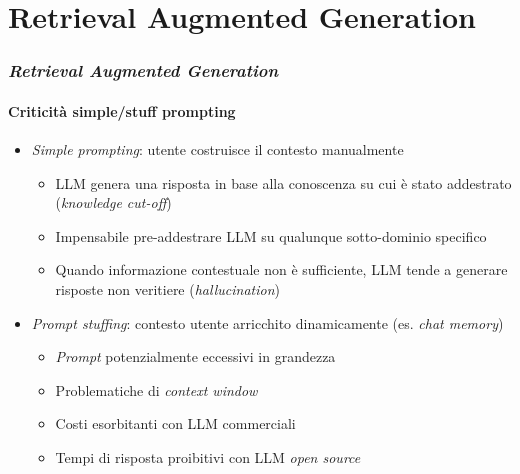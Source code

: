 \section{Retrieval Augmented Generation} %
\label{sec:rag}
%
\begin{frame}[t] \frametitle{\emph{Retrieval Augmented Generation}}
\framesubtitle{Criticità simple/stuff prompting}
{\footnotesize
{}
    \begin{minipage}[t]{\textwidth}
        \begin{itemize}[leftmargin=10pt,align=right]
            \item[\alert{\faArrowCircleRight}] \alert{\textit{Simple prompting}}: utente costruisce il contesto manualmente
            \begin{itemize}[leftmargin=10pt,align=right]
                \item[\alert{\faExclamationTriangle}] LLM genera una risposta in base alla conoscenza su cui è stato addestrato (\alert{\textit{knowledge cut-off}})
                \item[\alert{\faExclamationTriangle}] Impensabile pre-addestrare LLM su qualunque sotto-dominio specifico
                \item[\alert{\faExclamationTriangle}] Quando informazione contestuale non è sufficiente, LLM tende a generare risposte non veritiere (\alert{\textit{hallucination}})
            \end{itemize}
            \item[\alert{\faArrowCircleRight}] \alert{\textit{Prompt stuffing}}: contesto utente arricchito dinamicamente (es. \textit{chat memory}) 
            \begin{itemize}[leftmargin=10pt,align=right]
                \item[\alert{\faExclamationTriangle}] \textit{Prompt} potenzialmente eccessivi in grandezza
                \item[\alert{\faExclamationTriangle}] Problematiche di \textit{context window}
                \item[\alert{\faExclamationTriangle}] Costi esorbitanti con LLM commerciali
                \item[\alert{\faExclamationTriangle}] Tempi di risposta proibitivi con LLM \textit{open source}
            \end{itemize}
        \end{itemize}
    \end{minipage}
}
\end{frame}
